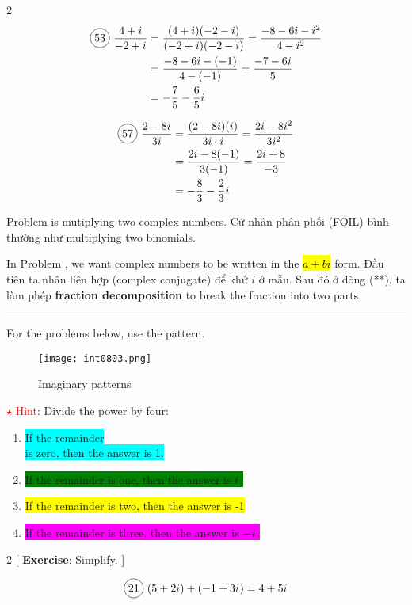 \begin{multicols}{2}
  \begin{align*}
    \circled{53}\ \frac{4+i}{-2+i}&=\frac{(4+i)(-2-i)}{(-2+i)(-2-i)}=\frac{-8-6i-i^{2}}{4-i^{2}}\\
    &=\frac{-8-6i-(-1)}{4-(-1)}=\frac{-7-6i}{5}\\
    &=-\frac{7}{5}-\frac{6}{5}i\\
  \end{align*}

  \begin{align*}
    \circled{57}\ \frac{2-8i}{3i}&=\frac{(2-8i)(i)}{3i\cdot i}=\frac{2i-8i^{2}}{3i^{2}}\\
    &=\frac{2i-8(-1)}{3(-1)}=\frac{2i+8}{-3}\\
    &=-\frac{8}{3}-\frac{2}{3}i
  \end{align*}
\end{multicols}

Problem  is mutiplying two complex numbers. Cứ nhân phân phối (FOIL) bình thường như multiplying two binomials.

In Problem , we want complex numbers to be written in the \hl{$a+bi$} form. Đầu tiên ta nhân liên hợp (complex conjugate) để khử $i$ ở mẫu. Sau đó ở dòng (**), ta làm phép \textbf{fraction decomposition} to break the fraction into two parts.


\noindent\rule{\textwidth}{0.8pt}

For the problems below, use the pattern.

\begin{figure}[htb!]
  \centering
  \texttt{[image: int0803.png]}
  \caption{Imaginary patterns}
  \label{fig:imaginary_pattern}
\end{figure}

\textcolor{red}{{\LARGE $\star$} Hint}: Divide the power by four:

\begin{enumerate}
  \item \colorbox{cyan}{If the remainder\\ is zero, then the answer is 1.}
  \item \colorbox{green}{If the remainder is one, then the answer is ${i\mkern1mu}$.}
  \item \colorbox{yellow}{If the remainder is two, then the answer is -1}
  \item \colorbox{magenta}{If the remainder is three, then the answer is $-{i\mkern1mu}$.}
\end{enumerate}

\begin{multicols}{2}
[
  \textbf{Exercise}: Simplify.
]

\begin{align*}
  \circled{21}\ (5+2i)+(-1+3\iu)=4+5i
\end{align*}
\end{multicols}
